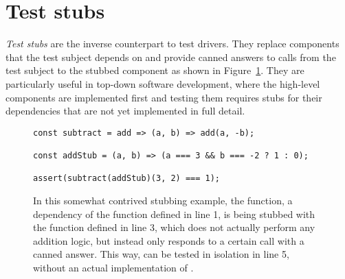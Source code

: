 \section{Test stubs}
\textit{Test stubs} are the inverse counterpart to test drivers.
They replace components that the test subject depends on
and provide canned answers to calls from the test subject to the stubbed component
\autocite{MocksArentStubs}
as shown in Figure~\ref{fig:TestStub}.
They are particularly useful in top-down software development,
where the high-level components are implemented first
and testing them requires stubs for their dependencies
that are not yet implemented in full detail.

\begin{figure}
  \begin{verbatim}
const subtract = add => (a, b) => add(a, -b);

const addStub = (a, b) => (a === 3 && b === -2 ? 1 : 0);

assert(subtract(addStub)(3, 2) === 1);
  \end{verbatim}
  \caption{
    In this somewhat contrived stubbing example,
    the  function,
    a dependency of the  function defined in line 1,
    is being stubbed with the  function defined in line 3,
    which does not actually perform any addition logic,
    but instead only responds to a certain call with a canned answer.
    This way,  can be tested in isolation in line 5,
    without an actual implementation of .
  }\label{fig:TestStub}
\end{figure}

